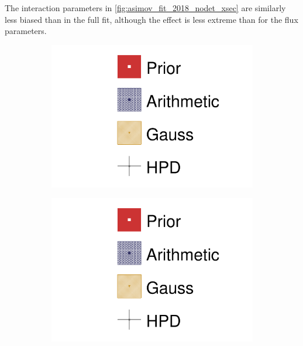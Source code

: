 The interaction parameters in \autoref{fig:asimov_fit_2018_nodet_xsec} are similarly less biased than in the full fit, although the effect is less extreme than for the flux parameters.
\begin{figure}[h]
	\centering
	\begin{subfigure}[t]{0.49\textwidth}
		\includegraphics[width=\textwidth,page=18, trim={0mm 0mm 0mm 9mm}, clip]{figures/mach3/2018/asimov/2018a_MultiPi_Binningv6_NewCov_Asimov_NoDet_merge_drawPar}
	\end{subfigure}
	\begin{subfigure}[t]{0.49\textwidth}
		\includegraphics[width=\textwidth,page=19, trim={0mm 0mm 0mm 9mm}, clip]{figures/mach3/2018/asimov/2018a_MultiPi_Binningv6_NewCov_Asimov_NoDet_merge_drawPar}
	\end{subfigure}
	

\end{figure}
